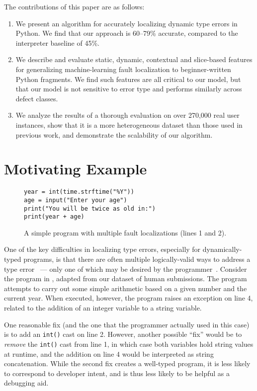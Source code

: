 \documentclass[conference]{IEEEtran}
\newcommand\lt[1]{{\lstinline|#1|}}
\begin{document}
The contributions of this paper are as follows:
\begin{enumerate}

\item We present an algorithm for accurately localizing dynamic type errors
in Python. We find that our approach is 60--79\% accurate, compared to
the interpreter baseline of 45\%.

\item We describe and evaluate static, dynamic, contextual and slice-based
features for generalizing machine-learning fault localization to
beginner-written Python fragments. We find such features are all critical
to our model, but that our model is not sensitive to error type and
performs similarly across defect classes.

\item We analyze the results of a thorough evaluation on over 270,000 real
user instances, show that it is a more heterogeneous dataset than those used
in previous work, and demonstrate the scalability of our algorithm.

\end{enumerate}

\section{Motivating Example}
\label{sec-motex}

\begin{figure}
\begin{lstlisting}
year = int(time.strftime("%Y"))
age = input("Enter your age")
print("You will be twice as old in:")
print(year + age)
\end{lstlisting}
\caption{
\label{fig-motex}
A simple program with multiple fault localizations (lines 1 and 2).}
\end{figure}

One of the key difficulties in localizing type errors, especially for
dynamically-typed programs, is that there are often multiple
logically-valid ways to address a type error~\cite{FIXME} --- only one of
which may be desired by the programmer~\cite{FIXME}.  Consider the program
in , adapted from our dataset of human submissions. The
program attempts to carry out some simple arithmetic based on a given
number and the current year. When executed, however, the program raises an
exception on line 4, related to the addition of an integer variable to a
string variable.

One reasonable fix (and the one that the programmer actually used in this
case) is to add an \lt{int()} cast on line 2. However, another possible
``fix'' would be to \textit{remove} the \lt{int()} cast from line 1, in
which case both variables hold string values at runtime, and the addition
on line 4 would be interpreted as string concatenation. While the second
fix creates a well-typed program, it is less likely to correspond to
developer intent, and is thus less likely to be helpful as a debugging aid.
\end{document}
